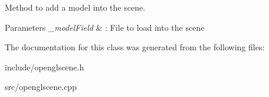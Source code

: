 Method to add a model into the scene. 


\begin{DoxyParams}{Parameters}
{\em \+\_\+model\+Field} & \+: File to load into the scene \\
\hline
\end{DoxyParams}


The documentation for this class was generated from the following files\+:\begin{DoxyCompactItemize}
\item 
include/openglscene.\+h\item 
src/openglscene.\+cpp\end{DoxyCompactItemize}
